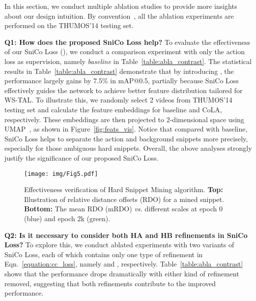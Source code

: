 \documentclass[final]{cvpr}
\begin{document}
\begin{table*}[t]
In this section, we conduct multiple ablation studies to provide more insights about our design intuition. By convention~\cite{nguyen2019weakly,shi2020weakly,lee2020background}, all the ablation experiments are performed on the THUMOS'14 testing set.

\textbf{Q1: How does the proposed SniCo Loss help?} To evaluate the effectiveness of our SniCo Loss (), we conduct a comparison experiment with only the action loss  as supervision, namely \textit{baseline} in Table~\ref{table:abla_contrast}. The statistical results in Table~\ref{table:abla_contrast} demonstrate that by introducing , the performance largely gains by 7.5\% in mAP@0.5, partially because SniCo Loss effectively guides the network to achieve better feature distribution tailored for WS-TAL. To illustrate this, we randomly select 2 videos from THUMOS'14 testing set and calculate the feature embeddings  for baseline and CoLA, respectively. These embeddings are then projected to 2-dimensional space using UMAP~\cite{2018arXivUMAP}, as shown in Figure~\ref{fig:feats_vis}. Notice that compared with baseline, SniCo Loss helps to separate the action and background snippets more precisely, especially for those ambiguous hard snippets. Overall, the above analyses strongly justify the significance of our proposed SniCo Loss. 

\begin{figure}[t]
\begin{center}
\texttt{[image: img/Fig5.pdf]}
\end{center}
   \caption{Effectiveness verification of Hard Snippet Mining algorithm. \textbf{Top:} Illustration of relative distance offsets (RDO) for a mined snippet. \textbf{Bottom:} The mean RDO (mRDO) \textit{vs.} different scales  at epoch 0 (blue) and epoch 2k (green). }
\label{fig:abla_context_loc}
\end{figure}

\textbf{Q2: Is it necessary to consider both HA and HB refinements in SniCo Loss?}
To explore this, we conduct ablated experiments with two variants of SniCo Loss, each of which contains only one type of refinement in Eqn.~\ref{equation:cc_loss}, namely  and , respectively. Table~\ref{table:abla_contrast} shows that the performance drops dramatically with either kind of refinement removed, suggesting that both refinements contribute to the improved performance. 


\end{table*}
\end{document}
